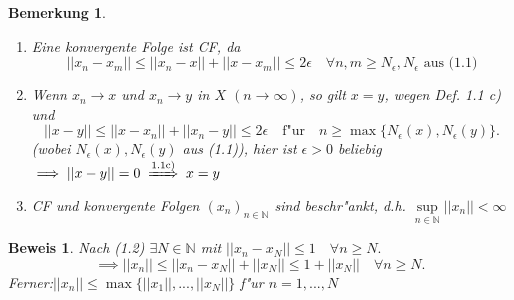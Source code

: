 \documentclass[a4paper,11pt]{book}
\def\folgt{\ensuremath{\implies}}
\newcommand{\folgtnach}[1]{\ensuremath{\DOTSB\;\xRightarrow{\text{#1}}\;}}
\newtheorem{Bem}[Def]{Bemerkung}
\theoremstyle{nonumberplain}
\newtheorem{Bew}[Def]{Beweis}
\begin{document}
\begin{Bem}
	\begin{enumerate}
	\item [(a)] Eine konvergente Folge ist CF, da
			\begin{displaymath}
				||x_{n}-x_{m}|| \leq ||x_{n}-x|| + ||x-x_{m}|| \leq 2\epsilon \quad \forall n,m \geq N_{\epsilon}, N_{\epsilon} \textrm{ aus (1.1)}
			\end{displaymath}
	\item [(b)] Wenn $x_{n} \rightarrow x$ und $x_{n} \rightarrow y$ in $X$ $(n\rightarrow \infty)$, so gilt $x=y$, wegen Def. 1.1 c) und
			\begin{displaymath}
				||x-y|| \leq ||x-x_{n}|| + ||x_{n}-y|| \leq 2\epsilon\quad \textrm{f"ur}\quad n\geq \max\{N_{\epsilon}(x),N_{\epsilon}(y)\}.
			\end{displaymath}
			(wobei $N_{\epsilon}(x),N_{\epsilon}(y)$ aus (1.1)), hier ist $\epsilon >0$ beliebig\\ $\folgt ||x-y||=0 \folgtnach{1.1c)} x=y$
	\item [(c)] CF und konvergente Folgen $(x_{n})_{n\in \mathbb{N}}$ sind beschr"ankt, d.h. $\sup\limits_{n\in\mathbb{N}}||x_{n}|| < \infty$
	\end{enumerate}
\end{Bem}
\begin{Bew}
Nach (1.2) \quad $\exists N\in\mathbb{N}$ mit $||x_{n}-x_{N}||\leq 1 \quad\forall n\geq N.$
\begin{displaymath}
 \folgt ||x_{n}||\leq ||x_{n}-x_{N}||+||x_{N}||\leq 1+||x_{N}|| \quad\forall n\geq N.
\end{displaymath}
\qquad Ferner:\qquad $||x_{n}|| \leq \max\{||x_{1}||,...,||x_{N}||\}$ f"ur $n=1,...,N$
\end{Bew}
\end{document}
